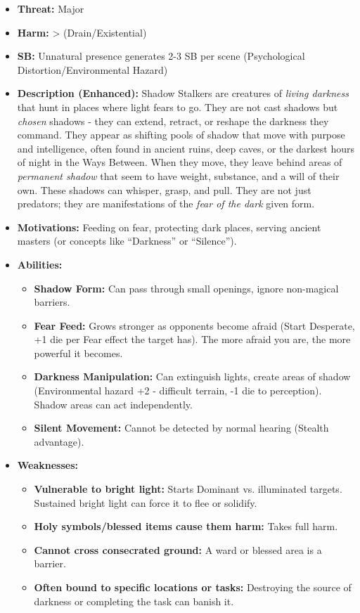 \documentclass[11pt]{article}
\begin{document}
\begin{itemize}
\item \textbf{Threat:} Major
\item \textbf{Harm:} > (Drain/Existential)
\item \textbf{SB:} Unnatural presence generates 2-3 SB per scene (Psychological Distortion/Environmental Hazard)
\item \textbf{Description (Enhanced):} Shadow Stalkers are creatures of \textit{living darkness} that hunt in places where light fears to go. They are not cast shadows but \textit{chosen} shadows - they can extend, retract, or reshape the darkness they command. They appear as shifting pools of shadow that move with purpose and intelligence, often found in ancient ruins, deep caves, or the darkest hours of night in the Ways Between. When they move, they leave behind areas of \textit{permanent shadow} that seem to have weight, substance, and a will of their own. These shadows can whisper, grasp, and pull. They are not just predators; they are manifestations of the \textit{fear of the dark} given form.
\item \textbf{Motivations:} Feeding on fear, protecting dark places, serving ancient masters (or concepts like ``Darkness'' or ``Silence'').
\item \textbf{Abilities:}
\begin{itemize}
\item \textbf{Shadow Form:} Can pass through small openings, ignore non-magical barriers.
\item \textbf{Fear Feed:} Grows stronger as opponents become afraid (Start Desperate, +1 die per Fear effect the target has). The more afraid you are, the more powerful it becomes.
\item \textbf{Darkness Manipulation:} Can extinguish lights, create areas of shadow (Environmental hazard +2 - difficult terrain, -1 die to perception). Shadow areas can act independently.
\item \textbf{Silent Movement:} Cannot be detected by normal hearing (Stealth advantage).
\end{itemize}
\item \textbf{Weaknesses:}
\begin{itemize}
\item \textbf{Vulnerable to bright light:} Starts Dominant vs. illuminated targets. Sustained bright light can force it to flee or solidify.
\item \textbf{Holy symbols/blessed items cause them harm:} Takes full harm.
\item \textbf{Cannot cross consecrated ground:} A ward or blessed area is a barrier.
\item \textbf{Often bound to specific locations or tasks:} Destroying the source of darkness or completing the task can banish it.
\end{itemize}
\end{itemize}
\end{document}
